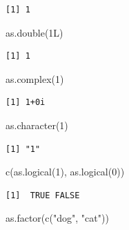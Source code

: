 \documentclass[
  letterpaper,
  DIV=11,
  numbers=noendperiod]{scrreprt}
\newenvironment{Shaded}{\begin{snugshade}}{\end{snugshade}}
\newcommand{\DecValTok}[1]{\textcolor[rgb]{0.68,0.00,0.00}{#1}}
\newcommand{\FunctionTok}[1]{\textcolor[rgb]{0.28,0.35,0.67}{#1}}
\newcommand{\NormalTok}[1]{\textcolor[rgb]{0.00,0.23,0.31}{#1}}
\newcommand{\StringTok}[1]{\textcolor[rgb]{0.13,0.47,0.30}{#1}}
\begin{document}
\begin{verbatim}
[1] 1
\end{verbatim}

\begin{Shaded}
\begin{Highlighting}[]
\FunctionTok{as.double}\NormalTok{(1L)}
\end{Highlighting}
\end{Shaded}

\begin{verbatim}
[1] 1
\end{verbatim}

\begin{Shaded}
\begin{Highlighting}[]
\FunctionTok{as.complex}\NormalTok{(}\DecValTok{1}\NormalTok{)}
\end{Highlighting}
\end{Shaded}

\begin{verbatim}
[1] 1+0i
\end{verbatim}

\begin{Shaded}
\begin{Highlighting}[]
\FunctionTok{as.character}\NormalTok{(}\DecValTok{1}\NormalTok{)}
\end{Highlighting}
\end{Shaded}

\begin{verbatim}
[1] "1"
\end{verbatim}

\begin{Shaded}
\begin{Highlighting}[]
\FunctionTok{c}\NormalTok{(}\FunctionTok{as.logical}\NormalTok{(}\DecValTok{1}\NormalTok{), }\FunctionTok{as.logical}\NormalTok{(}\DecValTok{0}\NormalTok{))}
\end{Highlighting}
\end{Shaded}

\begin{verbatim}
[1]  TRUE FALSE
\end{verbatim}

\begin{Shaded}
\begin{Highlighting}[]
\FunctionTok{as.factor}\NormalTok{(}\FunctionTok{c}\NormalTok{(}\StringTok{"dog"}\NormalTok{, }\StringTok{"cat"}\NormalTok{))}
\end{Highlighting}
\end{Shaded}
\end{document}
